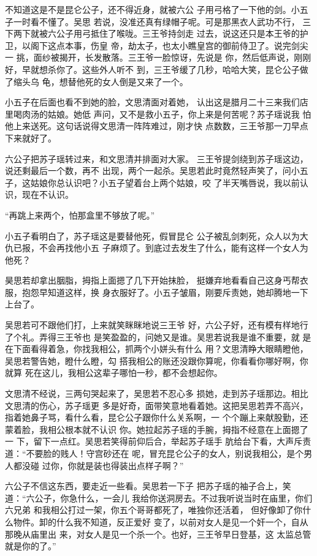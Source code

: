 不知道这是不是昆仑公子，还不得近身，就被六公
子用弓格了一下他的剑。小五子一时看不懂了。吴思
若说，没准还真有绿帽子呢。可是那黑衣人武功不行，
三下两下就被六公子用弓抵住了喉咙。三王爷持剑走
过去，说这还只是本王爷的护卫，以阁下这点本事，伤皇
帝，劫太子，也太小瞧皇宫的御前侍卫了。说完剑尖一
挑，面纱被揭开，长发散落。三王爷一脸惊讶，先说是
你，然后低声说，刚刚好，早就想杀你了。这些外人听不
到，三王爷缓了几秒，哈哈大笑，昆仑公子做了缩头乌
龟，想替他死的女人倒是又来了一个。

小五子在后面也看不到她的脸，文思清面对着她，
认出这是腊月二十三来我们店里喝肉汤的姑娘。她低
声问，又不是救小五子，你上来是何苦呢？苏子瑶说我
怕他上来送死。这句话说得文思清一阵阵难过，刚才快
点数数，三王爷那一刀早点下来就好了。

六公子把苏子瑶转过来，和文思清并排面对大家。
三王爷提剑绕到苏子瑶这边，说还剩最后一个数，再不
出现，两个一起杀。吴思若此时竟然轻声笑了，问小五
子，这姑娘你总认识吧？小五子望着台上两个姑娘，咬
了半天嘴唇说，我以前认识，现在不认识。

“再跳上来两个，怕那盒里不够放了呢。”

小五子看明白了，苏子瑶这是要替他死，假冒昆仑
公子被乱剑刺死，众人以为大仇已报，不会再找他小五
子麻烦了。到底过去发生了什么，能有这样一个女人为
他死？

昊思若却拿出胭脂，拇指上面摁了几下开始抹脸，
挺嫌弃地看看自己这身丐帮衣服，抱怨早知道这样，换
身衣服好了。小五子皱眉，刚要斥责她，她却腾地一下
上台了。

吴思若可不跟他们打，上来就笑眯眯地说三王爷
好，六公子好，还有模有样地行了个礼。弄得三王爷也
是笑盈盈的，问她又是谁。吴思若说我是谁不重要，就
是在下面看得着急，你找我相公，抓两个小姘头有什么
用？文思清睁大眼睛瞪他，吴思若警告她，瞪什么瞪，勾
搭我相公的账还没跟你算呢，你看看你哪好啊，你就算
死在这儿，我相公这辈子哪怕一秒，都不会想起你。

文思清不经说，三两句哭起来了，吴思若不忍心多
损她，走到苏子瑶那边。相比文思清的伤心，苏子瑶更
多是好奇，面带笑意地看着她。这把吴思若弄不高兴，
指着她鼻子骂，看什么看，昆仑公子跟你什么关系啊，一
个个蹦上来献股勤，还蒙着脸，我相公根本就不认识
你。她拉起苏子瑶的手腕，拇指不经意在上面摁了一
下，留下一点红。吴思若笑得前仰后合，举起苏子瑶手
肮给台下看，大声斥责道：“不要脸的贱人！守宫砂还在
呢，冒充昆仑公子的女人，别说我相公，是个男人都没碰
过你，你就是装也得装出点样子啊？”

六公子不信这东西，要走近一些看。吴思若一下子
把苏子瑶的袖子合上，笑道：“六公子，你急什么，一会儿
我给你送洞房去。不过我听说当时在庙里，你们六兄弟
和我相公打过一架，你五个哥哥都死了，唯独你还活着，
但好像卸了你什么物件。卸的什么我不知道，反正爱好
变了，以前对女人是见一个奸一个，自从那晚从庙里出
来，对女人是见一个杀一个。也好，三王爷早日登基，这
太监总管就是你的了。”


